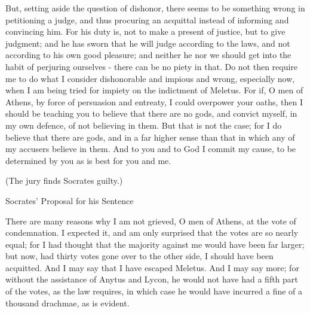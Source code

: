 But, setting aside the question of dishonor, there seems to be something
wrong in petitioning a judge, and thus procuring an acquittal instead
of informing and convincing him. For his duty is, not to make a present
of justice, but to give judgment; and he has sworn that he will judge
according to the laws, and not according to his own good pleasure;
and neither he nor we should get into the habit of perjuring ourselves
- there can be no piety in that. Do not then require me to do what
I consider dishonorable and impious and wrong, especially now, when
I am being tried for impiety on the indictment of Meletus. For if,
O men of Athens, by force of persuasion and entreaty, I could overpower
your oaths, then I should be teaching you to believe that there are
no gods, and convict myself, in my own defence, of not believing in
them. But that is not the case; for I do believe that there are gods,
and in a far higher sense than that in which any of my accusers believe
in them. And to you and to God I commit my cause, to be determined
by you as is best for you and me. 

(The jury finds Socrates guilty.)

Socrates' Proposal for his Sentence

There are many reasons why I am not grieved, O men of Athens, at the
vote of condemnation. I expected it, and am only surprised that the
votes are so nearly equal; for I had thought that the majority against
me would have been far larger; but now, had thirty votes gone over
to the other side, I should have been acquitted. And I may say that
I have escaped Meletus. And I may say more; for without the assistance
of Anytus and Lycon, he would not have had a fifth part of the votes,
as the law requires, in which case he would have incurred a fine of
a thousand drachmae, as is evident. 

